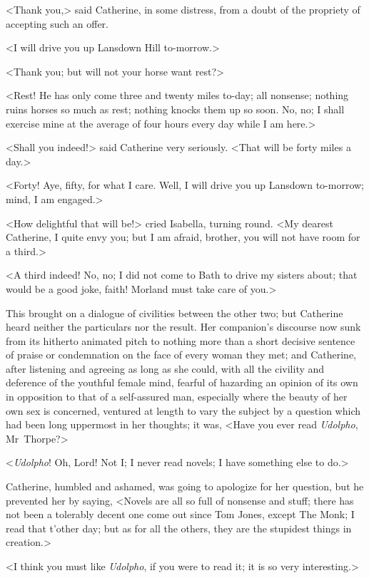  <Thank you,> said Catherine, in some distress, from a doubt of the propriety of accepting such an offer. 

 <I will drive you up Lansdown Hill to-morrow.> 

 <Thank you; but will not your horse want rest?> 

 <Rest! He has only come three and twenty miles to-day; all nonsense; nothing ruins horses so much as rest; nothing knocks them up so soon. No, no; I shall exercise mine at the average of four hours every day while I am here.> 

 <Shall you indeed!> said Catherine very seriously. <That will be forty miles a day.> 

 <Forty! Aye, fifty, for what I care. Well, I will drive you up Lansdown to-morrow; mind, I am engaged.> 

 <How delightful that will be!> cried Isabella, turning round. <My dearest Catherine, I quite envy you; but I am afraid, brother, you will not have room for a third.> 

 <A third indeed! No, no; I did not come to Bath to drive my sisters about; that would be a good joke, faith! Morland must take care of you.> 

 This brought on a dialogue of civilities between the other two; but Catherine heard neither the particulars nor the result. Her companion's discourse now sunk from its hitherto animated pitch to nothing more than a short decisive sentence of praise or condemnation on the face of every woman they met; and Catherine, after listening and agreeing as long as she could, with all the civility and deference of the youthful female mind, fearful of hazarding an opinion of its own in opposition to that of a self-assured man, especially where the beauty of her own sex is concerned, ventured at length to vary the subject by a question which had been long uppermost in her thoughts; it was, <Have you ever read \textit{Udolpho}, Mr~Thorpe?> 

 <\textit{Udolpho}! Oh, Lord! Not I; I never read novels; I have something else to do.> 

 Catherine, humbled and ashamed, was going to apologize for her question, but he prevented her by saying, <Novels are all so full of nonsense and stuff; there has not been a tolerably decent one come out since Tom Jones, except The Monk; I read that t'other day; but as for all the others, they are the stupidest things in creation.> 

 <I think you must like \textit{Udolpho}, if you were to read it; it is so very interesting.> 

